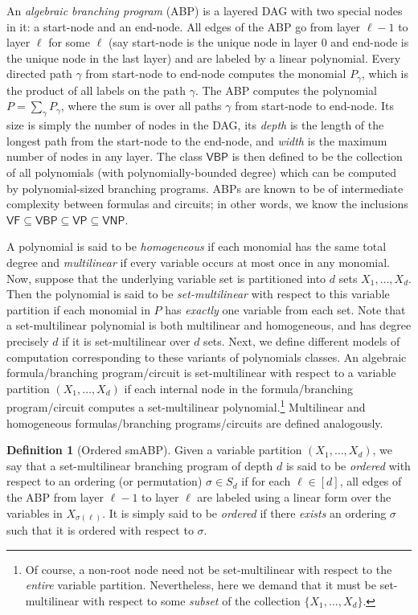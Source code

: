 \documentclass[10pt,a4paper]{article}
\theoremstyle{definition}%
\newtheorem{definition}[theorem]{Definition}
\theoremstyle{plain}
\newcommand{\VP}{\mathsf{VP}}
\newcommand{\VBP}{\mathsf{VBP}}
\newcommand{\VNP}{\mathsf{VNP}}
\newcommand{\VF}{\mathsf{VF}}
\newcommand{\sse}{\subseteq}
\begin{document}
An \emph{algebraic branching program} (ABP) is a layered DAG with two special nodes in
it: a start-node and an end-node. All edges of the ABP go from layer $\ell -1$ to layer $\ell$ for some $\ell$ (say start-node is the unique node in layer $0$ and end-node is the unique node in the last layer) and are labeled by a linear polynomial. Every directed path $\gamma$ from start-node to end-node computes the monomial $P_\gamma$,
which is the product of all labels on the path $\gamma$. The ABP computes the polynomial $P = \sum_{\gamma} P_\gamma$,
where the sum is over all paths $\gamma$ from start-node to end-node. Its size is simply the number of nodes in the DAG, its \emph{depth} is the length of the longest path from the start-node to the end-node, and \emph{width} is the maximum number of nodes in any layer. The class $\VBP$ is then defined to be the collection of all polynomials (with polynomially-bounded degree) which can be computed by polynomial-sized branching programs. ABPs are known to be of intermediate complexity between formulas and circuits; in other words, we know the inclusions $\VF\subseteq\VBP \subseteq \VP\sse \VNP$.

A polynomial is said to be \emph{homogeneous}
if each monomial has the same total degree and \emph{multilinear} if every variable occurs
at most once in any monomial. Now, suppose that the underlying variable set is partitioned into $d$ sets
$X_1,\ldots, X_d$. Then the polynomial is said to be \emph{set-multilinear} with respect to this variable partition if each
monomial in $P$ has \emph{exactly} one variable from each set. Note that a set-multilinear polynomial is both multilinear and homogeneous, and has degree precisely $d$ if it is set-multilinear over $d$ sets. Next, we define different models
of computation corresponding to these variants of polynomials classes. An algebraic formula/branching program/circuit is set-multilinear with respect to a variable partition
$(X_1,\ldots, X_d)$ if each internal node in the formula/branching program/circuit computes a set-multilinear polynomial.\footnote{Of course, a non-root node need not be set-multilinear with respect to the \emph{entire} variable partition. Nevertheless, here we demand that it must be set-multilinear with respect to some \emph{subset} of the collection $\{X_1,\ldots,X_d\}$.} Multilinear and homogeneous formulas/branching programs/circuits are defined analogously.  

\begin{definition}[Ordered smABP]\label{def:smABP}
Given a variable partition $(X_1,\ldots, X_d)$, we say that a set-multilinear branching program of depth $d$ is said to be \emph{ordered} with respect to an 
ordering (or permutation) $\sigma\in S_d$ if for each $\ell\in[d]$, all edges of the ABP from layer $\ell-1$ to layer $\ell$ are labeled using a linear form over the variables in $X_{\sigma(\ell)}$. It is simply said to be \emph{ordered} if there \emph{exists} an ordering $\sigma$ such that it is ordered with respect to $\sigma$.
\end{definition}
\end{document}
